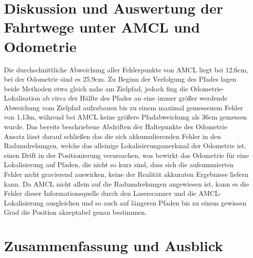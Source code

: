 \documentclass[11pt,a4paper]{article}
\begin{document}
\section{Diskussion und Auswertung der Fahrtwege unter AMCL und Odometrie}
Die durchschnittliche Abweichung aller Fehlerpunkte von AMCL liegt bei 12,6cm, bei der Odometrie sind es 25,9cm. Zu Beginn der Verfolgung des Pfades lagen beide Methoden 
etwa gleich nahe am Zielpfad, jedoch fing die Odometrie-Lokalisation  ab circa der Hälfte des Pfades an eine immer größer werdende Abweichung vom Zielpfad aufzubauen bis 
zu einem maximal gemessenem Fehler von 1,13m, während bei AMCL keine größere Pfadabweichung als 36cm gemessen wurde. Das bereits beschriebene Abdriften der 
Haltepunkte des Odometrie Ansatz lässt darauf schließen das die sich akkumulierenden Fehler in den Radumdrehungen, welche das alleinige Lokalisierungsmerkmal 
der Odometrie ist, einen Drift in der Positionierung verursachen, was bewirkt das Odometrie für eine Lokalisierung auf Pfaden, die nicht so kurz sind, dass sich die
aufsummierten Fehler nicht gravierend auswirken, keine der Realität akkuraten Ergebnisse liefern kann. Da AMCL nicht allein auf die Radumdrehungen angewiesen ist, kann es 
die Fehler dieser Informationsquelle durch den Laserscanner und die AMCL-Lokalisierung ausgleichen und so auch auf längeren Pfaden bis zu einem gewissen Grad die Position 
akzeptabel genau bestimmen.

\section{Zusammenfassung und Ausblick}

{%

}
\end{document}
